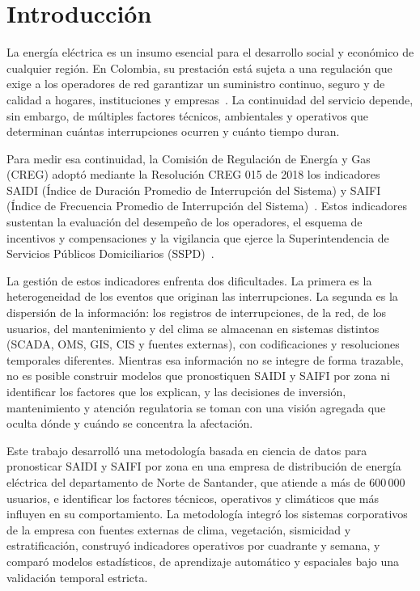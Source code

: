 \chapter*{Introducción}

La energía eléctrica es un insumo esencial para el desarrollo social y económico de cualquier región. En Colombia, su prestación está sujeta a una regulación que exige a los operadores de red garantizar un suministro continuo, seguro y de calidad a hogares, instituciones y empresas~\cite{ref1}. La continuidad del servicio depende, sin embargo, de múltiples factores técnicos, ambientales y operativos que determinan cuántas interrupciones ocurren y cuánto tiempo duran.

Para medir esa continuidad, la Comisión de Regulación de Energía y Gas (CREG) adoptó mediante la Resolución CREG 015 de 2018 los indicadores SAIDI (Índice de Duración Promedio de Interrupción del Sistema) y SAIFI (Índice de Frecuencia Promedio de Interrupción del Sistema)~\cite{ref1}. Estos indicadores sustentan la evaluación del desempeño de los operadores, el esquema de incentivos y compensaciones y la vigilancia que ejerce la Superintendencia de Servicios Públicos Domiciliarios (SSPD)~\cite{ref4}.

La gestión de estos indicadores enfrenta dos dificultades. La primera es la heterogeneidad de los eventos que originan las interrupciones. La segunda es la dispersión de la información: los registros de interrupciones, de la red, de los usuarios, del mantenimiento y del clima se almacenan en sistemas distintos (SCADA, OMS, GIS, CIS y fuentes externas), con codificaciones y resoluciones temporales diferentes. Mientras esa información no se integre de forma trazable, no es posible construir modelos que pronostiquen SAIDI y SAIFI por zona ni identificar los factores que los explican, y las decisiones de inversión, mantenimiento y atención regulatoria se toman con una visión agregada que oculta dónde y cuándo se concentra la afectación.

Este trabajo desarrolló una metodología basada en ciencia de datos para pronosticar SAIDI y SAIFI por zona en una empresa de distribución de energía eléctrica del departamento de Norte de Santander, que atiende a más de $600\,000$ usuarios, e identificar los factores técnicos, operativos y climáticos que más influyen en su comportamiento. La metodología integró los sistemas corporativos de la empresa con fuentes externas de clima, vegetación, sismicidad y estratificación, construyó indicadores operativos por cuadrante y semana, y comparó modelos estadísticos, de aprendizaje automático y espaciales bajo una validación temporal estricta.

